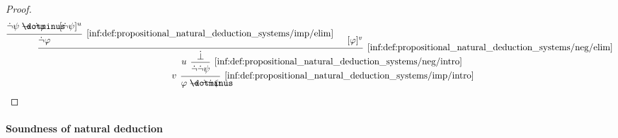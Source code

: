 \begin{proof}
  \begin{equation*}
    \begin{prooftree}
      \hypo{ \synneg \psi \synimplies \synneg \varphi }
      \hypo{ [\synneg \psi]^u }
      \infer2[\ref{inf:def:propositional_natural_deduction_systems/imp/elim}]{ \synneg \varphi }

      \hypo{ [\varphi]^v }
      \infer2[\ref{inf:def:propositional_natural_deduction_systems/neg/elim}]{ \synbot }

      \infer[left label=\( u \)]1[\ref{inf:def:propositional_natural_deduction_systems/neg/intro}]{ \synneg \synneg \psi }
      \infer[left label=\( v \)]1[\ref{inf:def:propositional_natural_deduction_systems/imp/intro}]{ \varphi \synimplies \synneg \synneg \psi }
    \end{prooftree}
  \end{equation*}
\end{proof}

\paragraph{Soundness of natural deduction}

